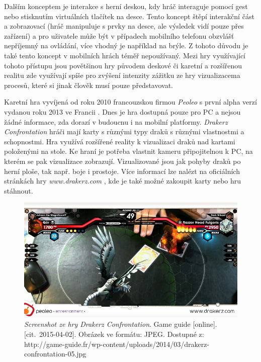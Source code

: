 \documentclass[twoside,12pt]{article}
\begin{document}
Dalším konceptem je interakce s herní deskou, kdy hráč interaguje pomocí gest nebo stisknutím virtuálních tlačítek na desce. Tento koncept štěpí interakční část a zobrazovací (hráč manipuluje s prvky na desce, ale výsledek vidí pouze přes zařízení) a pro uživatele může být v případech mobilního telefonu obzvlášť nepříjemný na ovládání, více vhodný je například na brýle. Z tohoto důvodu je také tento koncept v mobilních hrách téměř nepoužívaný. Mezi hry využívající tohoto přístupu jsou povětšinou hry původem deskové či karetní a rozšířenou realitu zde využívají spíše pro zvýšení intenzity zážitku ze hry vizualizacema procesů, které si jinak člověk musí pouze představovat. 

%
%

Karetní hra vyvíjená od roku 2010 francouzskou firmou \textit{Peoleo} s první alpha verzí vydanou roku 2013 ve Francii \cite{venturebeat}. Dnes je hra dostupná pouze pro PC a nejsou žádné informace, zda dorazí v budoucnu i na mobilní platformy. \textit{Drakerz Confrontation} hráči mají karty s různými typy draků s různými vlastnostmi a schopnostmi. Hra využívá rozšířené reality k vizualizaci draků nad kartami položenými na stole. Ke hraní je potřeba vlastnit kameru připojitelnou k PC, na kterém se pak vizualizace zobrazují. Vizualizované jsou jak pohyby draků po herní ploše, tak např. boje i prostoje. Více informací lze nalézt na oficiálních stránkách hry \textit{www.drakerz.com} \cite{peoleo_about}, kde je také možné zakoupit karty nebo hru stáhnout.


\begin{figure}[H]
    \includegraphics[width=424px, center]{images/drakerz-confrontation.jpg}
    \caption{\textit{Screenshot ze hry Drakerz Confrontation}. Game guide
	[online]. [cit.~2015-04-02]. Obrázek ve formátu: JPEG. Dostupné z: http://game-guide.fr/wp-content/uploads/2014/03/drakerz-confrontation-05.jpg}
    \label{drakerz_screenshot}
\end{figure}
\end{document}
